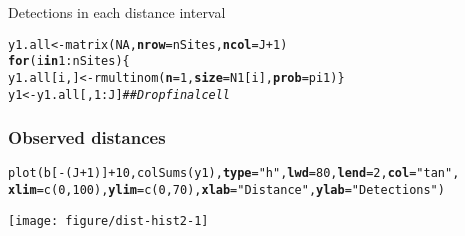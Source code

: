 \documentclass[color=usenames,dvipsnames]{beamer}\usepackage[]{graphicx}\usepackage[]{color}
\makeatletter
\newcommand{\hlnum}[1]{\textcolor[rgb]{0.69,0.494,0}{#1}}%
\newcommand{\hlstr}[1]{\textcolor[rgb]{0.749,0.012,0.012}{#1}}%
\newcommand{\hlcom}[1]{\textcolor[rgb]{0.514,0.506,0.514}{\textit{#1}}}%
\newcommand{\hlopt}[1]{\textcolor[rgb]{0,0,0}{#1}}%
\newcommand{\hlstd}[1]{\textcolor[rgb]{0,0,0}{#1}}%
\newcommand{\hlkwa}[1]{\textcolor[rgb]{0,0,0}{\textbf{#1}}}%
\newcommand{\hlkwb}[1]{\textcolor[rgb]{0,0.341,0.682}{#1}}%
\newcommand{\hlkwc}[1]{\textcolor[rgb]{0,0,0}{\textbf{#1}}}%
\newcommand{\hlkwd}[1]{\textcolor[rgb]{0.004,0.004,0.506}{#1}}%
\newenvironment{kframe}{%
 \def\at@end@of@kframe{}%
 \ifinner\ifhmode%
  \def\at@end@of@kframe{\end{minipage}}%
  \begin{minipage}{\columnwidth}%
 \fi\fi%
 \def\FrameCommand##1{\hskip\@totalleftmargin \hskip-\fboxsep
 \colorbox{shadecolor}{##1}\hskip-\fboxsep
     \hskip-\linewidth \hskip-\@totalleftmargin \hskip\columnwidth}%
 \MakeFramed {\advance\hsize-\width
   \@totalleftmargin\z@ \linewidth\hsize
   \@setminipage}}%
 {\par\unskip\endMakeFramed%
 \at@end@of@kframe}
\newenvironment{knitrout}{}{} %
\makeatother
\begin{document}
\begin{frame}[fragile]
\begin{knitrout}
\begin{kframe}
\end{kframe}
\end{knitrout}
  \pause
  \vfill
  Detections in each distance interval
  \vspace{-6pt}
\begin{knitrout}\scriptsize
{}\color{fgcolor}\begin{kframe}
\begin{alltt}
\hlstd{y1.all} \hlkwb{<-} \hlkwd{matrix}\hlstd{(}\hlnum{NA}\hlstd{,} \hlkwc{nrow}\hlstd{=nSites,} \hlkwc{ncol}\hlstd{=J}\hlopt{+}\hlnum{1}\hlstd{)}
\hlkwa{for}\hlstd{(i} \hlkwa{in} \hlnum{1}\hlopt{:}\hlstd{nSites) \{}
    \hlstd{y1.all[i,]} \hlkwb{<-} \hlkwd{rmultinom}\hlstd{(}\hlkwc{n}\hlstd{=}\hlnum{1}\hlstd{,} \hlkwc{size}\hlstd{=N1[i],} \hlkwc{prob}\hlstd{=pi1)    \}}
\hlstd{y1} \hlkwb{<-} \hlstd{y1.all[,}\hlnum{1}\hlopt{:}\hlstd{J]}  \hlcom{## Drop final cell}
\end{alltt}
\end{kframe}
\end{knitrout}
\end{frame}



\begin{frame}[fragile]
  \frametitle{Observed distances}
  \centering
\begin{knitrout}\scriptsize
{}\color{fgcolor}\begin{kframe}
\begin{alltt}
\hlkwd{plot}\hlstd{(b[}\hlopt{-}\hlstd{(J}\hlopt{+}\hlnum{1}\hlstd{)]}\hlopt{+}\hlnum{10}\hlstd{,} \hlkwd{colSums}\hlstd{(y1),} \hlkwc{type}\hlstd{=}\hlstr{"h"}\hlstd{,} \hlkwc{lwd}\hlstd{=}\hlnum{80}\hlstd{,} \hlkwc{lend}\hlstd{=}\hlnum{2}\hlstd{,} \hlkwc{col}\hlstd{=}\hlstr{"tan"}\hlstd{,}
     \hlkwc{xlim}\hlstd{=}\hlkwd{c}\hlstd{(}\hlnum{0}\hlstd{,}\hlnum{100}\hlstd{),} \hlkwc{ylim}\hlstd{=}\hlkwd{c}\hlstd{(}\hlnum{0}\hlstd{,} \hlnum{70}\hlstd{),} \hlkwc{xlab}\hlstd{=}\hlstr{"Distance"}\hlstd{,} \hlkwc{ylab}\hlstd{=}\hlstr{"Detections"}\hlstd{)}
\end{alltt}
\end{kframe}
\texttt{[image: figure/dist-hist2-1]} 

\end{knitrout}
\end{frame}
\end{document}

